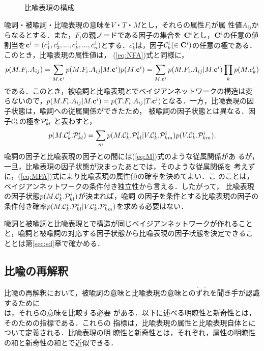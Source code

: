 \begin{figure}[htbp]
  \begin{center}
    \leavevmode
  \end{center}
  \caption{比喩表現の構成}
  \label{fig:metaphor}
\end{figure}

喩詞・被喩詞・比喩表現の意味を$V$・$T$・$M$とし，それらの属性$F_i$が属
性値$A_{ij}$からなるとする．また，$F_i$の親ノードである因子の集合を
${\bf C}^i$とし，${\bf C}^i$の任意の値割当を${{\bf c}^i} =
(c_1^i,c_2^i,...,c_k^i,...,c_n^i)$とする．$c_k^i$は，因子${\cal
C}_k^i(\in {\bf C}^i)$の任意の極である．このとき，比喩表現の属性値は，
(\ref{eq:NFA})式と同様に，
\begin{equation}
  \label{eq:MFA}
  p(M.F_i.A_{ij}) = \sum_{M.{\bf c}^i} p(M.F_i.A_{ij}|{M.{\bf c}^i}) p(M.{\bf c}^i) = \sum_{M.{\bf c}^i} p(M.F_i.A_{ij}|M.{\bf c}^i) \prod_k p(M.c_k^i)
\end{equation}
である．このとき，被喩詞と比喩表現とでベイジアンネットワークの構造は変
らないので，$p(M.F_i.A_{ij}|M.{\bf c}^i) = p(T.F_i.A_{ij}|T.{\bf
c}^i)$となる．一方，比喩表現の因子状態は，喩詞への従属関係ができたため，
被喩詞の因子状態とは異なる．因子${\cal C}_k^i$の極を${\cal P}^i_{kl}$
と表わすと，
\begin{equation}
  \label{eq:M}
  p(M.{\cal C}^i_k.{\cal P}^i_{kl}) = \sum_{m} p(M.{\cal C}^i_k.{\cal P}^i_{kl} | V.{\cal C}^i_k.{\cal P}^i_{km}) p(V.{\cal C}^i_k.{\cal P}^i_{km}).
\end{equation}
喩詞の因子と比喩表現の因子との間には(\ref{eq:M})式のような従属関係があ
るが，一旦，比喩表現の因子状態が決まったあとでは，そのような従属関係を
考えずに，(\ref{eq:MFA})式により比喩表現の属性値の確率を決めてよい．こ
のことは，ベイジアンネットワークの条件付き独立性から言える．したがって，
比喩表現の因子状態$p(M.{\cal C}^i_k.{\cal P}^i_{kl})$が決まれば，喩詞
の因子を条件とする比喩表現の因子の条件付き確率$p(M.{\cal C}^i_k.{\cal
P}^i_{kl}| V.{\cal C}^i_k.{\cal P}^i_{km})$を求める必要はない．

喩詞と被喩詞と比喩表現とで構造が同じベイジアンネットワークが作れること
と，喩詞と被喩詞の対応する因子状態から比喩表現の因子状態を決定できるこ
ととは第\ref{sec:sd}章で確かめる．

\subsection{比喩の再解釈}
\label{sec:re-interpretation}

比喩の再解釈において，被喩詞の意味と比喩表現の意味との$\dot{\mbox{ず}}
\dot{\mbox{れ}}$を聞き手が認識するために\\は，それらの意味を比較する必要
がある．以下に述べる明瞭性と新奇性とは，そのための指標である．これらの
指標は，比喩表現の属性と比喩表現自体とについて定義される．比喩表現の明
瞭性と新奇性とは，それぞれ，属性の明瞭性の和と新奇性の和とで近似できる．

